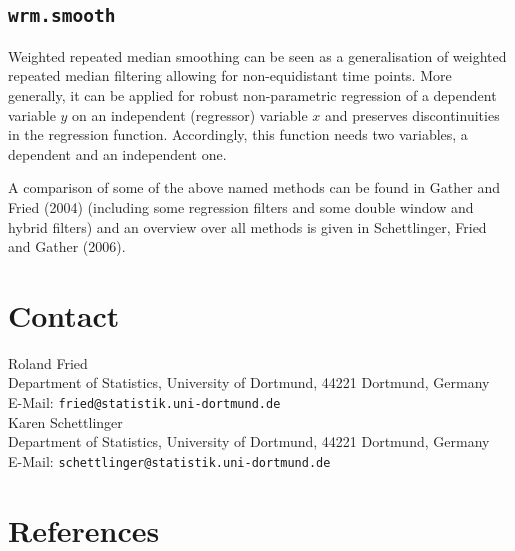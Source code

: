 \documentclass[a4paper]{scrartcl}
\begin{document}
\subsection{\texttt{wrm.smooth}}

Weighted repeated median smoothing can be seen as a generalisation
of weighted repeated median filtering allowing for non-equidistant
time points. More generally, it can be applied for robust
non-parametric regression of a dependent variable $y$ on an
independent (regressor) variable $x$ and preserves discontinuities
in the regression function. Accordingly, this function needs two
variables, a dependent and an independent one.




\vspace{1.5cm}
\noindent
A comparison of some of the above named methods can be found in
Gather and Fried (2004) (including some regression filters and
some double window and hybrid filters) and an overview over all
methods is given in Schettlinger, Fried and Gather (2006).

\section{Contact}


Roland Fried\\
Department of Statistics, University of Dortmund, 44221 Dortmund, Germany\\
E-Mail: \texttt{fried@statistik.uni-dortmund.de}\vspace*{0.5cm}\\
Karen Schettlinger\\
Department of Statistics, University of Dortmund, 44221 Dortmund, Germany\\
E-Mail: \texttt{schettlinger@statistik.uni-dortmund.de}

\section{References}
\end{document}
